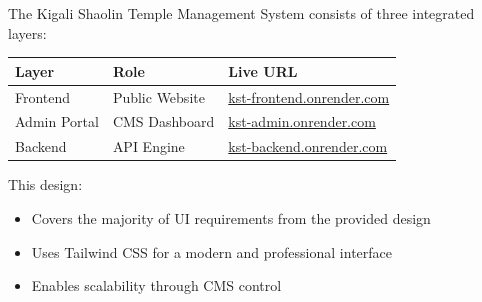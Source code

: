 \documentclass[12pt,a4paper]{article}
\begin{document}
The Kigali Shaolin Temple Management System consists of three integrated layers:

\begin{center}
\begin{tabular}{lll}
\toprule
Layer & Role & Live URL \\
\midrule
Frontend & Public Website & \href{https://kst-frontend.onrender.com}{kst-frontend.onrender.com} \\
Admin Portal & CMS Dashboard & \href{https://kst-admin.onrender.com}{kst-admin.onrender.com} \\
Backend & API Engine & \href{https://kst-backend.onrender.com}{kst-backend.onrender.com} \\
\bottomrule
\end{tabular}
\end{center}

This design:
\begin{itemize}
    \item Covers the majority of UI requirements from the provided design
    \item Uses Tailwind CSS for a modern and professional interface
    \item Enables scalability through CMS control
\end{itemize}
\end{document}
